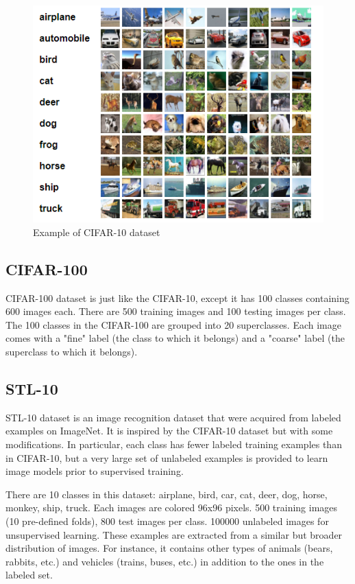 \begin{figure}[h]
	\includegraphics[scale=0.5]{figures/cifar10}
	\centering
	\caption{Example of CIFAR-10 dataset \cite{krizhevsky2009learning}}
	\label{fig:cifar10}
\end{figure}

\subsection{CIFAR-100}
CIFAR-100 \cite{krizhevsky2009learning} dataset is just like the CIFAR-10, except it has 100 classes containing 600 images each. There are 500 training images and 100 testing images per class. The 100 classes in the CIFAR-100 are grouped into 20 superclasses. Each image comes with a "fine" label (the class to which it belongs) and a "coarse" label (the superclass to which it belongs).

\subsection{STL-10}
STL-10 dataset \cite{coates2011analysis} is an image recognition dataset that were acquired from labeled examples on ImageNet. It is inspired by the CIFAR-10 dataset but with some modifications. In particular, each class has fewer labeled training examples than in CIFAR-10, but a very large set of unlabeled examples is provided to learn image models prior to supervised training. 

There are 10 classes in this dataset: airplane, bird, car, cat, deer, dog, horse, monkey, ship, truck. Each images are colored 96x96 pixels.
500 training images (10 pre-defined folds), 800 test images per class.
100000 unlabeled images for unsupervised learning. These examples are extracted from a similar but broader distribution of images. For instance, it contains other types of animals (bears, rabbits, etc.) and vehicles (trains, buses, etc.) in addition to the ones in the labeled set.


